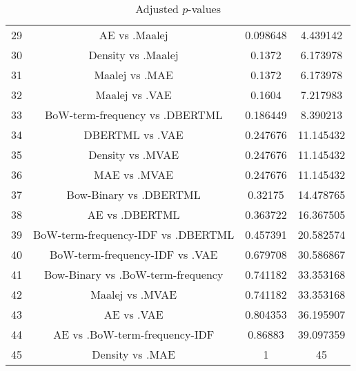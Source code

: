 \documentclass[a4paper,10pt]{article}
\begin{document}
\begin{landscape}
\begin{table}[!htp]
\begin{tabular}{cccc}
29&AE vs .Maalej&0.098648&4.439142\\
30&Density vs .Maalej&0.1372&6.173978\\
31&Maalej vs .MAE&0.1372&6.173978\\
32&Maalej vs .VAE&0.1604&7.217983\\
33&BoW-term-frequency vs .DBERTML&0.186449&8.390213\\
34&DBERTML vs .VAE&0.247676&11.145432\\
35&Density vs .MVAE&0.247676&11.145432\\
36&MAE vs .MVAE&0.247676&11.145432\\
37&Bow-Binary vs .DBERTML&0.32175&14.478765\\
38&AE vs .DBERTML&0.363722&16.367505\\
39&BoW-term-frequency-IDF vs .DBERTML&0.457391&20.582574\\
40&BoW-term-frequency-IDF vs .VAE&0.679708&30.586867\\
41&Bow-Binary vs .BoW-term-frequency&0.741182&33.353168\\
42&Maalej vs .MVAE&0.741182&33.353168\\
43&AE vs .VAE&0.804353&36.195907\\
44&AE vs .BoW-term-frequency-IDF&0.86883&39.097359\\
45&Density vs .MAE&1&45\\
\hline
\end{tabular}
\caption{Adjusted $p$-values}
\end{table}

\end{landscape}
\end{document}
